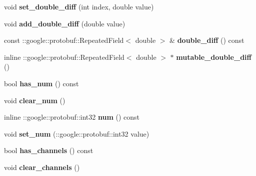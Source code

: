 \begin{DoxyCompactItemize}
\item 
\mbox{\label{classcaffe_1_1_blob_proto_aceafec56d8d227207509bc3d03067eea}} 
void {\bfseries set\+\_\+double\+\_\+diff} (int index, double value)
\item 
\mbox{\label{classcaffe_1_1_blob_proto_a0ae3e281d7a3d47e12eaa4ad8a7925e4}} 
void {\bfseries add\+\_\+double\+\_\+diff} (double value)
\item 
\mbox{\label{classcaffe_1_1_blob_proto_a1e40f0fa71f2424749472e69884fef9f}} 
const \+::google\+::protobuf\+::\+Repeated\+Field$<$ double $>$ \& {\bfseries double\+\_\+diff} () const
\item 
\mbox{\label{classcaffe_1_1_blob_proto_aa67ba5b16702e37f2e928d000d4ab9b7}} 
inline \+::google\+::protobuf\+::\+Repeated\+Field$<$ double $>$ $\ast$ {\bfseries mutable\+\_\+double\+\_\+diff} ()
\item 
\mbox{\label{classcaffe_1_1_blob_proto_aa6a41828d78615da02fc6c7e3457bed8}} 
bool {\bfseries has\+\_\+num} () const
\item 
\mbox{\label{classcaffe_1_1_blob_proto_a4e70457d14d904c67a4c06f60144bf9d}} 
void {\bfseries clear\+\_\+num} ()
\item 
\mbox{\label{classcaffe_1_1_blob_proto_a54ff85c1c4b98f015a5d687a8b723ed8}} 
inline \+::google\+::protobuf\+::int32 {\bfseries num} () const
\item 
\mbox{\label{classcaffe_1_1_blob_proto_abb28708efa83c24316ec6cbff51bd53c}} 
void {\bfseries set\+\_\+num} (\+::google\+::protobuf\+::int32 value)
\item 
\mbox{\label{classcaffe_1_1_blob_proto_ad916e13a7de09adf65cd3d8a49faab9b}} 
bool {\bfseries has\+\_\+channels} () const
\item 
\mbox{\label{classcaffe_1_1_blob_proto_af55fe190fa41be822990fd09e6095bb4}} 
void {\bfseries clear\+\_\+channels} ()

\end{DoxyCompactItemize}
